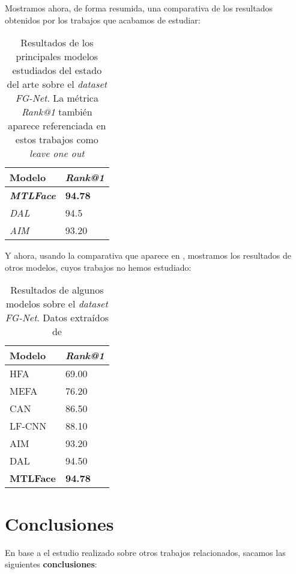 Mostramos ahora, de forma resumida, una comparativa de los resultados obtenidos por los trabajos que acabamos de estudiar:

\begin{table}[H]
\centering
\begin{tabular}{|l|l|}
    \hline
    Modelo & \textit{Rank@1} \\
    \hline

    \textbf{\textit{MTLFace}} & \textbf{94.78} \\
    \textit{DAL} & 94.5 \\
    \textit{AIM} & 93.20 \\
    \hline

\end{tabular}
\caption{Resultados de los principales modelos estudiados del estado del arte sobre el \textit{dataset} \textit{FG-Net}. La métrica \textit{Rank@1} también aparece referenciada en estos trabajos como \textit{leave one out}}
\end{table}

Y ahora, usando la comparativa que aparece en \cite{informatica:best_fgnet_model}, mostramos los resultados de otros modelos, cuyos trabajos no hemos estudiado:

\begin{table}[H]
\centering
\begin{tabular}{|l|l|}
    \hline
    Modelo & \textit{Rank@1} \\
    \hline
    HFA & 69.00 \\
    MEFA & 76.20 \\
    CAN & 86.50 \\
    LF-CNN & 88.10 \\
    AIM & 93.20 \\
    DAL & 94.50 \\
    \textbf{MTLFace} & \textbf{94.78} \\
    \hline
\end{tabular}
\caption{Resultados de algunos modelos sobre el \textit{dataset} \textit{FG-Net}. Datos extraídos de \cite{informatica:best_fgnet_model}}
\end{table}

\section{Conclusiones}

En base a el estudio realizado sobre otros trabajos relacionados, sacamos las siguientes \textbf{conclusiones}:


